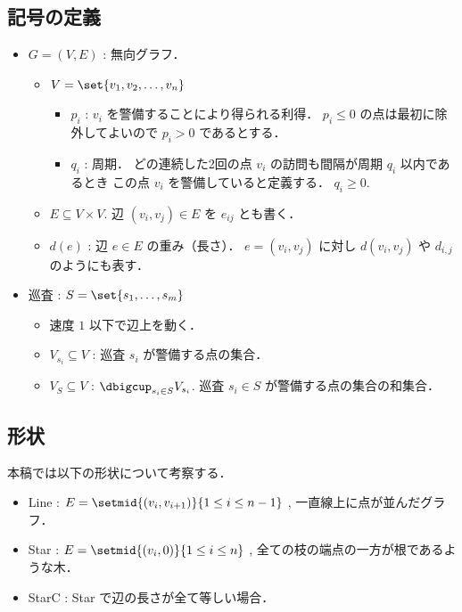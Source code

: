 \subsection{記号の定義}
\begin{itemize}
	\item $G = (V,E)$ : 無向グラフ．
	\begin{itemize}
		\item $V = \set{ v_1, v_2, \ldots, v_n }$
		\begin{itemize}
			\item $p_i$ : $v_i$ を警備することにより得られる利得．
			$p_i \leq 0$ の点は最初に除外してよいので $p_i > 0$ であるとする．
			\item $q_i$ : 周期．
			どの連続した2回の点 $v_i$ の訪問も間隔が周期 $q_i$ 以内であるとき
			この点 $v_i$ を警備していると定義する．
			$q_i \geq 0$.
		\end{itemize}
		\item $E \subseteq V \times V$. 辺 $(v_i, v_j) \in E$ を $e_{ij}$ とも書く．
		\item $d(e)$ : 辺 $e \in E$ の重み（長さ）．
		$e = (v_i, v_j)$ に対し $d(v_i,v_j)$ や $d_{i,j}$ のようにも表す．
	\end{itemize}

	\item 巡査 : $S = \set{ s_1, \ldots, s_m }$
	\begin{itemize}
		\item 速度 $1$ 以下で辺上を動く．
		\item $V_{s_i} \subseteq V$ : 巡査 $s_i$ が警備する点の集合．
		\item $V_S     \subseteq V$ : $\dbigcup_{s_i \in S} V_{s_i}$. 
		巡査 $s_i \in S$ が警備する点の集合の和集合．
	\end{itemize}
\end{itemize}



\subsection{形状}
本稿では以下の形状について考察する．

\begin{itemize}
	\item Line    : $E = \setmid{ (v_i, v_{i + 1}) }{ 1 \leq i \leq n - 1 }$ ,
	一直線上に点が並んだグラフ．
	\item Star    : $E = \setmid{ (v_i, 0) }{ 1 \leq i \leq n }$ ,
	全ての枝の端点の一方が根であるような木．
	\item StarC   : Star で辺の長さが全て等しい場合．
\end{itemize}




